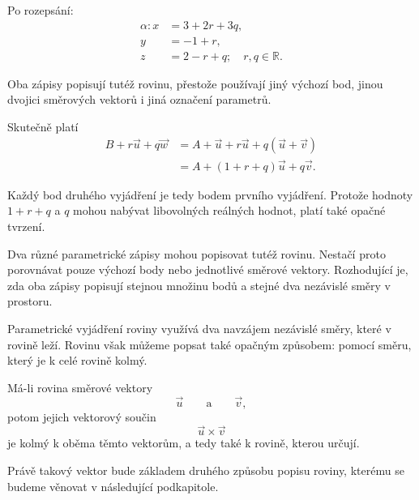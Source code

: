 Po rozepsání:
\[
    \begin{aligned}
        \alpha: x&=3+2r+3q,\\
        y&=-1+r,\\
        z&=2-r+q; \quad r,q\in\mathbb{R}.
    \end{aligned}
\]

Oba zápisy popisují tutéž rovinu, přestože používají jiný výchozí bod,
jinou dvojici směrových vektorů i jiná označení parametrů.

Skutečně platí
\begin{align*}
    B+r\vec{u}+q\vec{w}
    &=
    A+\vec{u}+r\vec{u}+q(\vec{u}+\vec{v})\\
    &=
    A+(1+r+q)\vec{u}+q\vec{v}.
\end{align*}

Každý bod druhého vyjádření je tedy bodem prvního vyjádření. Protože
hodnoty $1+r+q$ a $q$ mohou nabývat libovolných reálných hodnot, platí
také opačné tvrzení.

\begin{remark}
    Dva různé parametrické zápisy mohou popisovat tutéž rovinu.
    Nestačí proto porovnávat pouze výchozí body nebo jednotlivé
    směrové vektory. Rozhodující je, zda oba zápisy popisují stejnou
    množinu bodů a stejné dva nezávislé směry v prostoru.
\end{remark}


Parametrické vyjádření roviny využívá dva navzájem nezávislé směry,
které v rovině leží. Rovinu však můžeme popsat také opačným způsobem:
pomocí směru, který je k celé rovině kolmý.

Má-li rovina směrové vektory
\[
    \vec{u}
    \qquad\text{a}\qquad
    \vec{v},
\]
potom jejich vektorový součin
\[
    \vec{u}\times\vec{v}
\]
je kolmý k oběma těmto vektorům, a tedy také k rovině, kterou určují.

Právě takový vektor bude základem druhého způsobu popisu roviny,
kterému se budeme věnovat v následující podkapitole.
